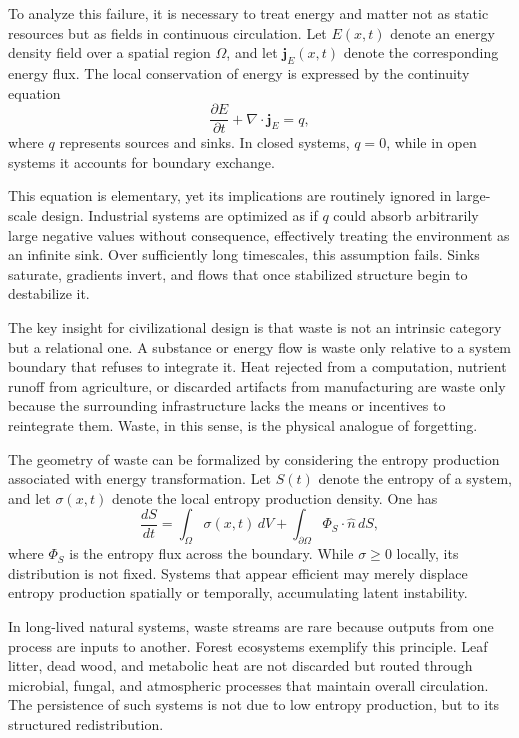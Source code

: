 \documentclass[12pt,oneside]{book}
\begin{document}
To analyze this failure, it is necessary to treat energy and matter not as static resources but as fields in continuous circulation. Let \(E(x,t)\) denote an energy density field over a spatial region \(\Omega\), and let \(\mathbf{j}_E(x,t)\) denote the corresponding energy flux. The local conservation of energy is expressed by the continuity equation
\[
\frac{\partial E}{\partial t} + \nabla \cdot \mathbf{j}_E = q,
\]
where \(q\) represents sources and sinks. In closed systems, \(q = 0\), while in open systems it accounts for boundary exchange.

This equation is elementary, yet its implications are routinely ignored in large-scale design. Industrial systems are optimized as if \(q\) could absorb arbitrarily large negative values without consequence, effectively treating the environment as an infinite sink. Over sufficiently long timescales, this assumption fails. Sinks saturate, gradients invert, and flows that once stabilized structure begin to destabilize it.

The key insight for civilizational design is that waste is not an intrinsic category but a relational one. A substance or energy flow is waste only relative to a system boundary that refuses to integrate it. Heat rejected from a computation, nutrient runoff from agriculture, or discarded artifacts from manufacturing are waste only because the surrounding infrastructure lacks the means or incentives to reintegrate them. Waste, in this sense, is the physical analogue of forgetting.

The geometry of waste can be formalized by considering the entropy production associated with energy transformation. Let \(S(t)\) denote the entropy of a system, and let \(\sigma(x,t)\) denote the local entropy production density. One has
\[
\frac{dS}{dt} = \int_{\Omega} \sigma(x,t)\, dV + \int_{\partial \Omega} \Phi_S \cdot \hat{n}\, dS,
\]
where \(\Phi_S\) is the entropy flux across the boundary. While \(\sigma \geq 0\) locally, its distribution is not fixed. Systems that appear efficient may merely displace entropy production spatially or temporally, accumulating latent instability.

In long-lived natural systems, waste streams are rare because outputs from one process are inputs to another. Forest ecosystems exemplify this principle. Leaf litter, dead wood, and metabolic heat are not discarded but routed through microbial, fungal, and atmospheric processes that maintain overall circulation. The persistence of such systems is not due to low entropy production, but to its structured redistribution.
\end{document}
